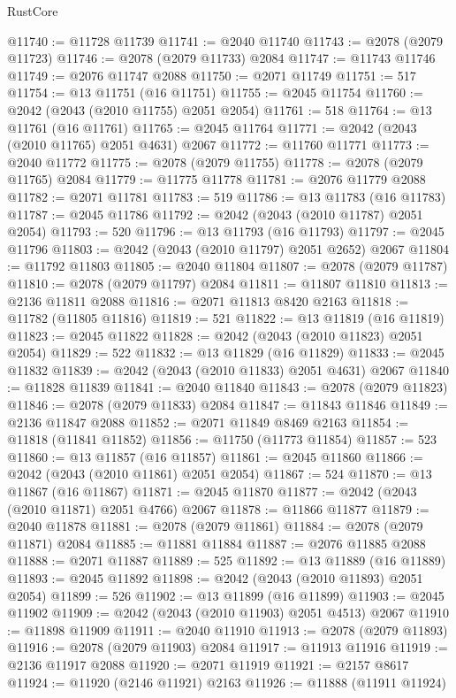 \begin{lexlean}{RustCore}
\begin{coremodule}
@11740 := @11728 @11739
@11741 := @2040 @11740
@11743 := @2078 (@2079 @11723)
@11746 := @2078 (@2079 @11733) @2084
@11747 := @11743 @11746
@11749 := @2076 @11747 @2088
@11750 := @2071 @11749
@11751 := 517
@11754 := @13 @11751 (@16 @11751)
@11755 := @2045 @11754
@11760 := @2042 (@2043 (@2010 @11755) @2051 @2054)
@11761 := 518
@11764 := @13 @11761 (@16 @11761)
@11765 := @2045 @11764
@11771 := @2042 (@2043 (@2010 @11765) @2051 @4631) @2067
@11772 := @11760 @11771
@11773 := @2040 @11772
@11775 := @2078 (@2079 @11755)
@11778 := @2078 (@2079 @11765) @2084
@11779 := @11775 @11778
@11781 := @2076 @11779 @2088
@11782 := @2071 @11781
@11783 := 519
@11786 := @13 @11783 (@16 @11783)
@11787 := @2045 @11786
@11792 := @2042 (@2043 (@2010 @11787) @2051 @2054)
@11793 := 520
@11796 := @13 @11793 (@16 @11793)
@11797 := @2045 @11796
@11803 := @2042 (@2043 (@2010 @11797) @2051 @2652) @2067
@11804 := @11792 @11803
@11805 := @2040 @11804
@11807 := @2078 (@2079 @11787)
@11810 := @2078 (@2079 @11797) @2084
@11811 := @11807 @11810
@11813 := @2136 @11811 @2088
@11816 := @2071 @11813 @8420 @2163
@11818 := @11782 (@11805 @11816)
@11819 := 521
@11822 := @13 @11819 (@16 @11819)
@11823 := @2045 @11822
@11828 := @2042 (@2043 (@2010 @11823) @2051 @2054)
@11829 := 522
@11832 := @13 @11829 (@16 @11829)
@11833 := @2045 @11832
@11839 := @2042 (@2043 (@2010 @11833) @2051 @4631) @2067
@11840 := @11828 @11839
@11841 := @2040 @11840
@11843 := @2078 (@2079 @11823)
@11846 := @2078 (@2079 @11833) @2084
@11847 := @11843 @11846
@11849 := @2136 @11847 @2088
@11852 := @2071 @11849 @8469 @2163
@11854 := @11818 (@11841 @11852)
@11856 := @11750 (@11773 @11854)
@11857 := 523
@11860 := @13 @11857 (@16 @11857)
@11861 := @2045 @11860
@11866 := @2042 (@2043 (@2010 @11861) @2051 @2054)
@11867 := 524
@11870 := @13 @11867 (@16 @11867)
@11871 := @2045 @11870
@11877 := @2042 (@2043 (@2010 @11871) @2051 @4766) @2067
@11878 := @11866 @11877
@11879 := @2040 @11878
@11881 := @2078 (@2079 @11861)
@11884 := @2078 (@2079 @11871) @2084
@11885 := @11881 @11884
@11887 := @2076 @11885 @2088
@11888 := @2071 @11887
@11889 := 525
@11892 := @13 @11889 (@16 @11889)
@11893 := @2045 @11892
@11898 := @2042 (@2043 (@2010 @11893) @2051 @2054)
@11899 := 526
@11902 := @13 @11899 (@16 @11899)
@11903 := @2045 @11902
@11909 := @2042 (@2043 (@2010 @11903) @2051 @4513) @2067
@11910 := @11898 @11909
@11911 := @2040 @11910
@11913 := @2078 (@2079 @11893)
@11916 := @2078 (@2079 @11903) @2084
@11917 := @11913 @11916
@11919 := @2136 @11917 @2088
@11920 := @2071 @11919
@11921 := @2157 @8617
@11924 := @11920 (@2146 @11921) @2163
@11926 := @11888 (@11911 @11924)

\end{coremodule}
\end{lexlean}
